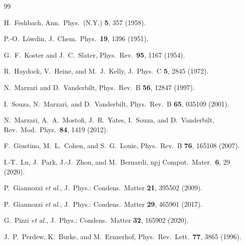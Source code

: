 \documentclass[aps,prx,reprint,superscriptaddress,nofootinbib,longbibliography]{revtex4-2}
\begin{document}
\begin{thebibliography}{99}

 H.~Feshbach, Ann.\ Phys.\ (N.Y.) \textbf{5}, 357 (1958).

 P.-O.~L\"owdin, J.\ Chem.\ Phys.\ \textbf{19}, 1396 (1951).

 G.~F.~Koster and J.~C.~Slater,
Phys.\ Rev.\ \textbf{95}, 1167 (1954).

 R.~Haydock, V.~Heine, and M.~J.~Kelly,
J.\ Phys.\ C \textbf{5}, 2845 (1972).

 N.~Marzari and D.~Vanderbilt,
Phys.\ Rev.\ B \textbf{56}, 12847 (1997).

 I.~Souza, N.~Marzari, and D.~Vanderbilt,
Phys.\ Rev.\ B \textbf{65}, 035109 (2001).

 N.~Marzari, A.~A.~Mostofi, J.~R.~Yates, I.~Souza, and
D.~Vanderbilt, Rev.\ Mod.\ Phys.\ \textbf{84}, 1419 (2012).

 F.~Giustino, M.~L.~Cohen, and S.~G.~Louie,
Phys.\ Rev.\ B \textbf{76}, 165108 (2007).

 I.-T.~Lu, J.~Park, J.-J.~Zhou, and M.~Bernardi,
npj Comput.\ Mater.\ \textbf{6}, 29 (2020).

 P.~Giannozzi \textit{et al.},
J.\ Phys.: Condens.\ Matter \textbf{21}, 395502 (2009).

 P.~Giannozzi \textit{et al.},
J.\ Phys.: Condens.\ Matter \textbf{29}, 465901 (2017).

 G.~Pizzi \textit{et al.},
J.\ Phys.: Condens.\ Matter \textbf{32}, 165902 (2020).

 J.~P.~Perdew, K.~Burke, and M.~Ernzerhof,
Phys.\ Rev.\ Lett.\ \textbf{77}, 3865 (1996).

\end{thebibliography}
\end{document}
